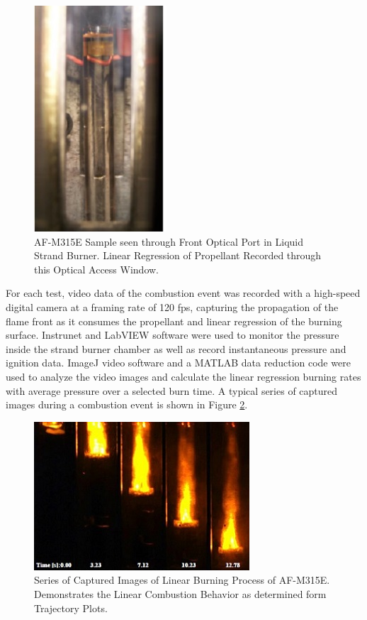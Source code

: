 \documentclass{article}
\begin{document}
\begin{figure}[htb!]
\centering
\includegraphics[width=0.25\textheight]{Figure_4.jpg}
\caption{AF-M315E Sample seen through Front Optical Port in Liquid Strand Burner. Linear Regression of Propellant Recorded through this Optical Access Window.}
\label{fig4}
\end{figure}

For each test, video data of the combustion event was recorded with a high-speed digital camera at a framing rate
of 120 fps, capturing the propagation of the flame front as it consumes the propellant and linear regression of the
burning surface. Instrunet and LabVIEW software were used to monitor the pressure inside the strand burner chamber
as well as record instantaneous pressure and ignition data. ImageJ video software and a MATLAB data reduction code
were used to analyze the video images and calculate the linear regression burning rates with average pressure over
a selected burn time. A typical series of captured images during a combustion event is shown in Figure \ref{fig5}.

\begin{figure}[htb!]
\centering
\includegraphics[width=0.25\textheight]{Figure_5.jpg}
\caption{Series of Captured Images of Linear Burning Process of AF-M315E. Demonstrates the Linear Combustion Behavior as determined form Trajectory Plots.}
\label{fig5}
\end{figure}
\end{document}
